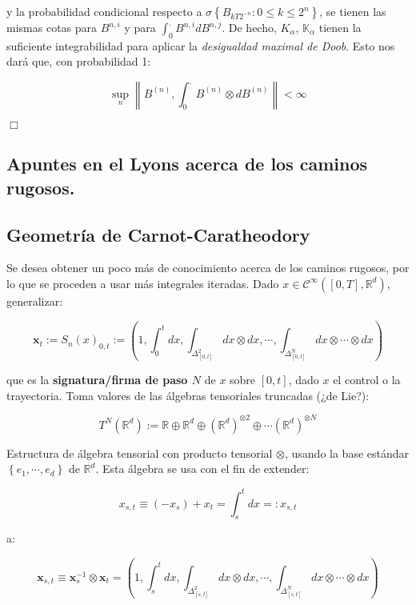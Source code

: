 y la probabilidad condicional respecto a $\sigma \left\{ B_{kT2^{-n}} : 0 \leq k \leq 2^n \right\}$, se tienen las mismas cotas para $B^{n,i}$ y para $\int_0^{.} B^{n,i} dB^{n,j}$. De hecho, $K_{\alpha}$, $\mathbb{K}_{\alpha}$ tienen la suficiente integrabilidad para aplicar la \textit{desigualdad maximal de Doob}. Esto nos dará que, con probabilidad 1:

\[
	\sup_n \left\lVert B^{(n)}, \int_0^{.} B^{(n)} \otimes dB^{(n)} \right\rVert < \infty
\]

\begin{flushright}
	$\Box$
\end{flushright}


\subsection{Apuntes en el Lyons acerca de los caminos rugosos.}


\subsection{Geometría de Carnot-Caratheodory}

Se desea obtener un poco más de conocimiento acerca de los caminos rugosos, por lo que se proceden a usar más integrales iteradas. Dado $x \in \mathcal{C}^{\infty} ([0,T], \mathbb{R}^d)$, generalizar:

\[
	\mathbf{x}_t := S_n (x)_{0, t} := \left( 1, \int_0^t dx, \int_{\Delta_{[0,t]}^2 } dx \otimes dx, \cdots, \int_{ \Delta_{[0,t]}^N  } dx \otimes \cdots \otimes dx \right)
\]

que es la \textbf{signatura/firma de paso $N$} de $x$ sobre $[0,t]$, dado $x$ el control o la trayectoria. Toma valores de las álgebras tensoriales truncadas (¿de Lie?):

\[
	T^N (\mathbb{R}^d) := \mathbb{R} \oplus \mathbb{R}^d \oplus \left( \mathbb{R}^d \right)^{\otimes 2} \oplus \cdots (\mathbb{R}^d)^{\otimes N}
\]

Estructura de álgebra tensorial con producto tensorial $\otimes$, usando la base estándar $\left\{ e_1, \cdots, e_d \right\}$ de $\mathbb{R}^d$. Esta álgebra se usa con el fin de extender:

\[
	x_{s,t} \equiv (-x_s) + x_t = \int_s^t dx =: x_{s,t}
\]


a:

\[
	\mathbf{x}_{s,t} \equiv \mathbf{x}_s^{-1} \otimes \mathbf{x}_t = \left( 1, \int_s^t dx, \int_{ \Delta_{[s,t]}^2 } dx \otimes dx, \cdots, \int_{ \Delta_{[s,t]}^N } dx \otimes \cdots \otimes dx \right)
\]


